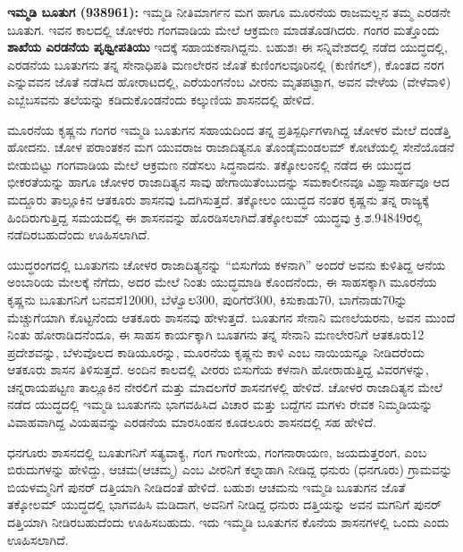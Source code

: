 \textbf{ ಇಮ್ಮಡಿ ಬೂತುಗ (938\general{\enginline{-}}961):} ಇಮ್ಮಡಿ ನೀತಿಮಾರ್ಗನ ಮಗ ಹಾಗೂ ಮೂರನೆಯ ರಾಜಮಲ್ಲನ ತಮ್ಮ ಎರಡನೇ ಬೂತುಗ. ಇವನ ಕಾಲದಲ್ಲಿ ಚೋಳರು ಗಂಗವಾಡಿಯ ಮೇಲೆ ಆಕ್ರಮಣ ಮಾಡತೊಡಗಿದರು. ಗಂಗರ ಮತ್ತೊಂದು \textbf{ಶಾಖೆಯ ಎರಡನೆಯ ಪೃಥ್ವೀಪತಿಯು} ಇದಕ್ಕೆ ಸಹಾಯಕನಾಗಿದ್ದನು. ಬಹುಶಃ ಈ ಸನ್ನಿವೇಶದಲ್ಲಿ ನಡೆದ ಯುದ್ಧದಲ್ಲಿ, ಎರಡನೆಯ ಬೂತುಗನು ತನ್ನ ಸೇನಾಧಿಪತಿ ಮಣಲೇರನ ಜೊತೆ ಕುಣಿಂಗಲವೂರಿನಲ್ಲಿ (ಕುಣಿಗಲ್​), ಕೊಂತದ ನರಗ ಎನ್ನುವವನ ಜೊತೆ ನಡೆಸಿದ ಹೋರಾಟದಲ್ಲಿ, ಎರೆಯಂಗನೆಂಬ ವೀರನು ಮೃತಪಟ್ಟಾಗ, ಅವನ ವೇಳೆಯ (ವೇಳೆವಾಳಿ) ಎಬ್ಬೆಬಸವನು ತಲೆಯನ್ನು ಕಡಿದುಕೊಂಡನೆಂದು ಕಲ್ಕುಣಿಯ ಶಾಸನದಲ್ಲಿ ಹೇಳಿದೆ.

ಮೂರನೆಯ ಕೃಷ್ಣನು ಗಂಗರ ಇಮ್ಮಡಿ ಬೂತುಗನ ಸಹಾಯದಿಂದ ತನ್ನ ಪ್ರತಿಸ್ಪರ್ಧಿಗಳಾಗಿದ್ದ ಚೋಳರ ಮೇಲೆ ದಂಡೆತ್ತಿ ಹೋದನು. ಚೋಳ ಪರಾಂತಕನ ಮಗ ಯುವರಾಜ ರಾಜಾದಿತ್ಯನೂ ತೊಂಡೈಮಂಡಲಮ್ ಕೋಟೆಯಲ್ಲಿ ಸೇನೆಯೊಡನೆ ಬೀಡುಬಿಟ್ಟು ಗಂಗವಾಡಿಯ ಮೇಲೆ ಆಕ್ರಮಣ ನಡೆಸಲು ಸಿದ್ಧನಾದನು. ತಕ್ಕೋಲಂನಲ್ಲಿ ನಡೆದ ಈ ಯುದ್ಧದ ಭೀಕರತೆಯನ್ನು ಹಾಗೂ ಚೋಳರ ರಾಜಾದಿತ್ಯನ ಸಾವು ಹೇಗಾಯಿತೆಂಬುದನ್ನು ಸಮಕಾಲೀನವೂ ವಿಶ್ವಾಸಾರ್ಹವೂ ಆದ ಮದ್ದೂರು ತಾಲ್ಲೂಕಿನ ಆತಕೂರು ಶಾಸನವು ಒದಗಿಸುತ್ತದೆ. ತಕ್ಕೋಲಂ ಯುದ್ಧದ ನಂತರ ಕೃಷ್ಣನು ತನ್ನ ರಾಜ್ಯಕ್ಕೆ ಹಿಂದಿರುಗುತ್ತಿದ್ದ ಸಮಯದಲ್ಲಿ ಈ ಶಾಸನವನ್ನು ಹೊರಡಿಸಲಾಗಿದೆ.ತಕ್ಕೋಲಮ್ ಯುದ್ಧವು ಕ್ರಿ.ಶ.948\enginline{-}49ರಲ್ಲಿ ನಡೆದಿರಬಹುದೆಂದು ಊಹಿಸಲಾಗಿದೆ.

ಯುದ್ಧರಂಗದಲ್ಲಿ ಬೂತುಗನು ಚೋಳರ ರಾಜಾದಿತ್ಯನನ್ನು “ಬಿಸುಗೆಯ ಕಳನಾಗಿ” ಅಂದರೆ ಅವನು ಕುಳಿತಿದ್ದ ಆನೆಯ ಅಂಬಾರಿಯ ಮೇಲಕ್ಕೆ ನೆಗೆದು, ಅದರ ಮೇಲೆ ನಿಂತು ಯುದ್ಧಮಾಡಿ ಕೊಂದನೆಂದು, ಈ ಸಾಹಸಕ್ಕಾಗಿ ಮೂರನೆಯ ಕೃಷ್ಣನು ಬೂತುಗನಿಗೆ ಬನವಸೆ\enginline{-}12000, ಬೆಳ್ವೊಲ\enginline{-}300, ಪುರಿಗೆರೆ\enginline{-}300, ಕಿಸುಕಾಡು\enginline{-}70, ಬಾಗೆನಾಡು\enginline{-}70ನ್ನು ಮೆಚ್ಚುಗೆಯಾಗಿ ಕೊಟ್ಟನೆಂದು ಆತಕೂರು ಶಾಸನವು ಹೇಳುತ್ತದೆ. ಬೂತುಗನ ಸೇನಾನಿ ಮಣಲೆಯರನು, ಅವನ ಮುಂದೆ ನಿಂತು ಹೋರಾಡಿದನೆಂದೂ, ಈ ಸಾಹಸ ಕಾರ್ಯಕ್ಕಾಗಿ ಬೂತಗನು ತನ್ನ ಸೇನಾನಿ ಮಣಲೇರನಿಗೆ ಆತಕೂರು\enginline{-}12 ಪ್ರದೇಶವನ್ನು, ಬೆಳುವೊಲದ ಕಾಡಿಯೂರನ್ನು, ಮೂರನೆಯ ಕೃಷ್ಣನು ಕಾಳಿ ಎಂಬ ನಾಯಿಯನ್ನೂ ನೀಡಿದರೆಂದು ಆತಕೂರು ಶಾಸನ ತಿಳಿಸುತ್ತದೆ. ಅಂದಿನ ಕಾಲದಲ್ಲಿ ವೀರರು ಬಿಸುಗೆಯ ಕಳನಾಗಿ ಹೋರಾಡುತ್ತಿದ್ದ ವಿವರಗಳನ್ನು, ಚನ್ನರಾಯಪಟ್ಟಣ ತಾಲ್ಲೂಕಿನ ನೇರಲಿಗೆ ಮತ್ತು ಮಾದಲಗೆರೆ ಶಾಸನಗಳಲ್ಲಿ ಹೇಳಿದೆ. ಚೋಳರ ರಾಜಾದಿತ್ಯನ ಮೇಲೆ ನಡೆದ ಯುದ್ಧದಲ್ಲಿ ಇಮ್ಮಡಿ ಬೂತುಗನು ಭಾಗವಹಿಸಿದ ವಿಚಾರ ಮತ್ತು ಬದ್ದೆಗನ ಮಗಳು ರೇವಕ ನಿಮ್ಮಡಿಯನ್ನು ವಿವಾಹವಾಗಿದ್ದ ವಿಯಷವನ್ನು ಎರಡನೆಯ ಮಾರಸಿಂಹನ ಕೂಡಲೂರು ಶಾಸನದಲ್ಲಿ ಸಹ ಹೇಳಿದೆ.

ಧನಗೂರು ಶಾಸನದಲ್ಲಿ ಬೂತುಗನಿಗೆ ಸತ್ಯವಾಕ್ಯ, ಗಂಗ ಗಾಂಗೇಯ, ಗಂಗನಾರಾಯಣ, ಜಯದುತ್ತರಂಗ, ಎಂಬ ಬಿರುದುಗಳನ್ನು ಹೇಳಿದ್ದು, ಆಚಮ(ಆಚಮ್ಮ) ಎಂಬ ವೀರನಿಗೆ ಕಲ್ನಾಡಾಗಿ ನೀಡಿದ್ದ ಧನುರು (ಧನಗೂರು) ಗ್ರಾಮವನ್ನು ಬಿಯಳಮ್ಮನಿಗೆ ಪುನರ್​ ದತ್ತಿಯಾಗಿ ನೀಡಿದಂತೆ ಹೇಳಿದೆ. ಬಹುಶಃ ಆಚಮನು ಇಮ್ಮಡಿ ಬೂತುಗನ ಜೊತೆ ತಕ್ಕೋಲಮ್ ಯುದ್ಧದಲ್ಲಿ ಭಾಗವಹಿಸಿ ಮಡಿದಾಗ, ಅವನಿಗೆ ನೀಡಿದ್ದ ಧನುರು ದತ್ತಿಯನ್ನು ಅವನ ಮಗನಿಗೆ ಪುನರ್​ದತ್ತಿಯಾಗಿ ನೀಡಿರಬಹು\-ದೆಂದು ಊಹಿಸಬಹುದು. ಇದು ಇಮ್ಮಡಿ ಬೂತುಗನ ಕೊನೆಯ ಶಾಸನಗಳಲ್ಲಿ ಒಂದು ಎಂದು ಊಹಿಸಲಾಗಿದೆ.

